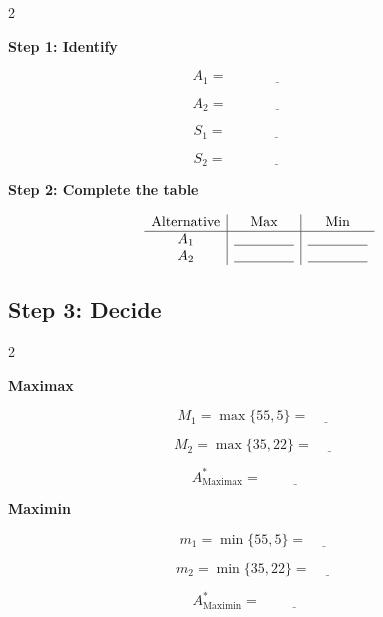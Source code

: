 	\begin{multicols}{2}
		
		\textbf{Step 1: Identify}
		
		\[
		A_1=\underline{\hspace{3cm}}
		\]
		
		\[
		A_2=\underline{\hspace{3cm}}
		\]
		
		\[
		S_1=\underline{\hspace{3cm}}
		\]
		
		\[
		S_2=\underline{\hspace{3cm}}
		\]
		
		\columnbreak
		
		\textbf{Step 2: Complete the table}
		
		\[
		\begin{array}{c|c|c}
			\text{Alternative} & \text{Max} & \text{Min}\\
			\hline
			A_1 & \underline{\hspace{1.5cm}} & \underline{\hspace{1.5cm}}\\
			A_2 & \underline{\hspace{1.5cm}} & \underline{\hspace{1.5cm}}
		\end{array}
		\]
		
	\end{multicols}
	
	\subsection*{Step 3: Decide}
	
	\begin{multicols}{2}
		
		\textbf{Maximax}
		
		\[
		M_1=\max\{55,5\}=\underline{\hspace{1cm}}
		\]
		
		\[
		M_2=\max\{35,22\}=\underline{\hspace{1cm}}
		\]
		
		\[
		A^*_{\mathrm{Maximax}}
		=\underline{\hspace{2cm}}
		\]
		
		\columnbreak
		
		\textbf{Maximin}
		
		\[
		m_1=\min\{55,5\}=\underline{\hspace{1cm}}
		\]
		
		\[
		m_2=\min\{35,22\}=\underline{\hspace{1cm}}
		\]
		
		\[
		A^*_{\mathrm{Maximin}}
		=\underline{\hspace{2cm}}
		\]
		
	\end{multicols}
	
